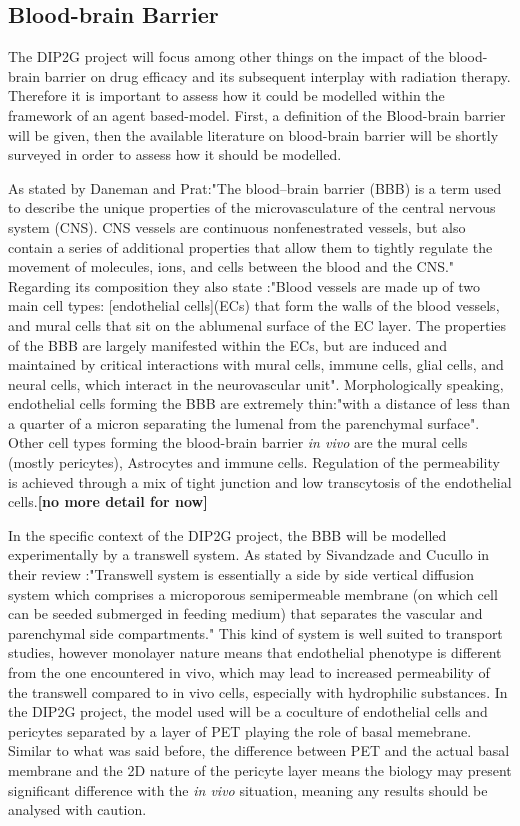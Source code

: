 \documentclass[11pt,a4paper]{article}
\begin{document}
\subsection{Blood-brain Barrier}
The DIP2G project will focus among other things on the impact of the blood-brain barrier on drug efficacy and its subsequent interplay with radiation therapy. Therefore it is important to assess how it could be modelled within the framework of an agent based-model. First, a definition of the Blood-brain barrier will be given, then the available literature on blood-brain barrier will be shortly surveyed in order to assess how it should be modelled.

As stated by Daneman and Prat:"The blood–brain barrier (BBB) is a term used to describe the unique properties of the microvasculature of the central nervous system (CNS). CNS vessels are continuous nonfenestrated vessels, but also contain a series of additional properties that allow them to tightly regulate the movement of molecules, ions, and cells between the blood and the CNS."\cite{Daneman2015} Regarding its composition they also state :"Blood vessels are made up of two main cell types: [endothelial cells](ECs) that form the walls of the blood vessels, and mural cells that sit on the ablumenal surface of the EC layer. The properties of the BBB are largely manifested within the ECs, but are induced and maintained by critical interactions with mural cells, immune cells, glial cells, and neural cells, which interact in the neurovascular unit". Morphologically speaking, endothelial cells forming the BBB are extremely thin:"with a distance of less than a quarter of a micron separating the lumenal from the parenchymal surface". Other cell types forming the blood-brain barrier \textit{in vivo} are the mural cells (mostly pericytes), Astrocytes and immune cells. Regulation of the permeability is achieved through a mix of tight junction and low transcytosis of the endothelial cells.\textbf{[no more detail for now]}

In the specific context of the DIP2G project, the BBB will be modelled experimentally by a transwell system. As stated by Sivandzade and Cucullo in their review :"Transwell system is essentially a side by side vertical diffusion system which comprises a microporous semipermeable membrane (on which cell can be seeded submerged in feeding medium) that separates the vascular and parenchymal side compartments."\cite{Sivandzade2018} This kind of system is well suited to transport studies, however monolayer nature means that endothelial phenotype is different from the one encountered in vivo, which may lead to increased permeability of the transwell compared to in vivo cells, especially with hydrophilic substances. In the DIP2G project, the model used will be a coculture of endothelial cells and pericytes separated by a layer of PET playing the role of basal memebrane. Similar to what was said before, the difference between PET and the actual basal membrane and the 2D nature of the pericyte layer means the biology may present significant difference with the \textit{in vivo} situation, meaning any results should be analysed with caution. 
\end{document}
